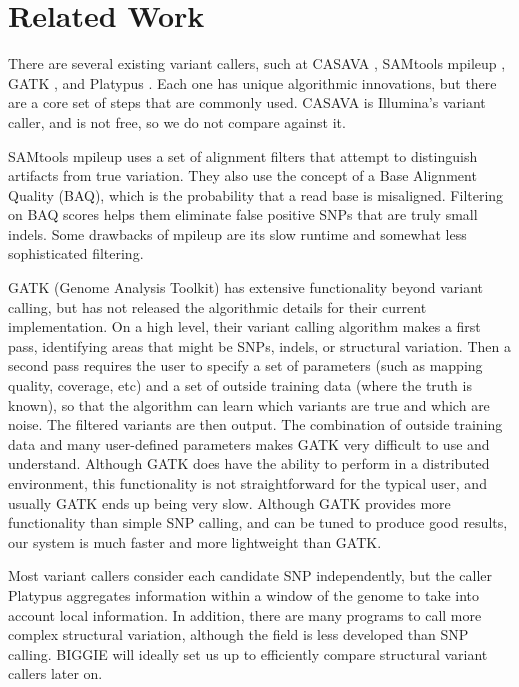 \documentclass[10pt]{article}
\begin{document}
\section{Related Work}
\label{sec:relatedWork}

There are several existing variant callers, such at CASAVA \cite{casava}, SAMtools mpileup \cite{samtools}, GATK \cite{gatk}, and Platypus \cite{platypus}. Each one has unique algorithmic innovations, but there are a core set of steps that are commonly used. CASAVA is Illumina's variant caller, and is not free, so we do not compare against it.

SAMtools mpileup uses a set of alignment filters that attempt to distinguish artifacts from true variation. They also use the concept of a Base Alignment Quality (BAQ), which is the probability that a read base is misaligned. Filtering on BAQ scores helps them eliminate false positive SNPs that are truly small indels. Some drawbacks of mpileup are its slow runtime and somewhat less sophisticated filtering.


GATK (Genome Analysis Toolkit) has extensive functionality beyond variant calling, but has not released the algorithmic details for their current implementation. On a high level, their variant calling algorithm makes a first pass, identifying areas that might be SNPs, indels, or structural variation. Then a second pass requires the user to specify a set of parameters (such as mapping quality, coverage, etc) and a set of outside training data (where the truth is known), so that the algorithm can learn which variants are true and which are noise. The filtered variants are then output. The combination of outside training data and many user-defined parameters makes GATK very difficult to use and understand. Although
GATK does have the ability to perform in a distributed environment, this
functionality is not straightforward for the typical user, and usually GATK
ends up being very slow.  Although GATK provides more functionality than simple
SNP calling, and can be tuned to produce good results, our system is much faster and more
lightweight than GATK.

Most variant callers consider each candidate SNP independently, but the caller
Platypus aggregates information within a window of the genome to take into
account local information. In addition, there are many programs to call more
complex structural variation, although the field is less developed than SNP
calling.  BIGGIE will ideally set us up to efficiently compare structural variant callers later on.
\end{document}
